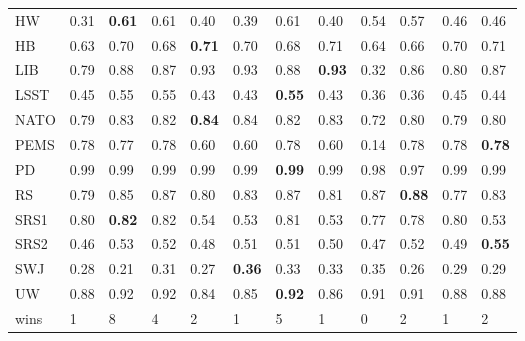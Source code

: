 \begin{table}
\begin{tabular}{p{0.6cm}*{11}{p{0.55cm}}}
     HW &          0.31 & \textbf{0.61} &          0.61 &          0.40 &          0.39 &          0.61 &          0.40 & 0.54 &          0.57 &          0.46 &          0.46 \\
     HB &          0.63 &          0.70 &          0.68 & \textbf{0.71} &          0.70 &          0.68 &          0.71 & 0.64 &          0.66 &          0.70 &          0.71 \\
    LIB &          0.79 &          0.88 &          0.87 &          0.93 &          0.93 &          0.88 & \textbf{0.93} & 0.32 &          0.86 &          0.80 &          0.87 \\
   LSST &          0.45 &          0.55 &          0.55 &          0.43 &          0.43 & \textbf{0.55} &          0.43 & 0.36 &          0.36 &          0.45 &          0.44 \\
   NATO &          0.79 &          0.83 &          0.82 & \textbf{0.84} &          0.84 &          0.82 &          0.83 & 0.72 &          0.80 &          0.79 &          0.80 \\
   PEMS &          0.78 &          0.77 &          0.78 &          0.60 &          0.60 &          0.78 &          0.60 & 0.14 &          0.78 &          0.78 & \textbf{0.78} \\
     PD &          0.99 &          0.99 &          0.99 &          0.99 &          0.99 & \textbf{0.99} &          0.99 & 0.98 &          0.97 &          0.99 &          0.99 \\
     RS &          0.79 &          0.85 &          0.87 &          0.80 &          0.83 &          0.87 &          0.81 & 0.87 & \textbf{0.88} &          0.77 &          0.83 \\
   SRS1 &          0.80 & \textbf{0.82} &          0.82 &          0.54 &          0.53 &          0.81 &          0.53 & 0.77 &          0.78 &          0.80 &          0.53 \\
   SRS2 &          0.46 &          0.53 &          0.52 &          0.48 &          0.51 &          0.51 &          0.50 & 0.47 &          0.52 &          0.49 & \textbf{0.55} \\
    SWJ &          0.28 &          0.21 &          0.31 &          0.27 & \textbf{0.36} &          0.33 &          0.33 & 0.35 &          0.26 &          0.29 &          0.29 \\
     UW &          0.88 &          0.92 &          0.92 &          0.84 &          0.85 & \textbf{0.92} &          0.86 & 0.91 &          0.91 &          0.88 &          0.88 \\
   wins &             1 &             8 &             4 &             2 &             1 &             5 &             1 &    0 &             2 &             1 &             2 \\
\bottomrule
\end{tabular}
\end{table}
